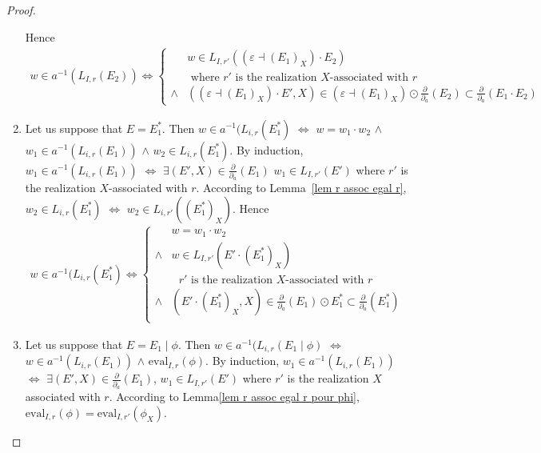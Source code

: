 \documentclass[a4paper]{llncs}
\begin{document}
\begin{proof}
\begin{enumerate}
      Hence 
        \begin{align*}
        w\in a^{-1}(L_{I,r}(E_2))
        \Leftrightarrow
        \begin{cases}
          & w\in L_{I,r'}( (\varepsilon\dashv (E_1)_X) \cdot E_2)\\
          & \text{ where $r'$ is the realization $X$-associated with $r$}\\
          \wedge & ((\varepsilon\dashv (E_1)_X) \cdot E',X) \in (\varepsilon\dashv (E_1)_X)\odot \frac{\partial}{\partial_a}(E_2) \subset \frac{\partial}{\partial_a}(E_1\cdot E_2)
        \end{cases}
        \end{align*}
\item Let us suppose that $E=E_1^*$. Then       
      $w\in a^{-1}(L_{i,r}(E_1^*)$      
      $\Leftrightarrow$ $w=w_1\cdot w_2 $ $\wedge$ $w_1\in a^{-1}(L_{i,r}(E_1))$ $\wedge$ $w_2\in L_{i,r}(E_1^*)$.      
      By induction, $w_1\in a^{-1}(L_{i,r}(E_1))$      
      $\Leftrightarrow$ $\exists (E',X)\in\frac{\partial}{\partial_a}(E_1)$ $w_1\in L_{I,r'}(E')$ where $r'$ is the realization $X$-associated with $r$.      
      According to Lemma~\ref{lem r assoc egal r}, $w_2\in L_{i,r}(E_1^*)$      
      $\Leftrightarrow$ $w_2\in L_{i,r'}((E_1^*)_X)$.      
      Hence 
        \begin{align*}
        w\in a^{-1}(L_{i,r}(E_1^*)
        \Leftrightarrow
        \begin{cases}
          & w=w_1\cdot w_2 \\
          \wedge & w\in L_{I,r'}(E'\cdot (E_1^*)_X)\\
          & \text{ $r'$ is the realization $X$-associated with $r$}\\
          \wedge & (E'\cdot (E_1^*)_X,X) \in \frac{\partial}{\partial_a}(E_1)\odot E_1^* \subset \frac{\partial}{\partial_a}(E_1^*)\\
        \end{cases}
        \end{align*}
\item Let us suppose that $E=E_1\mid \phi$. Then      
      $w\in a^{-1}(L_{i,r}(E_1\mid \phi)$      
      $\Leftrightarrow$ $w\in a^{-1}(L_{i,r}(E_1))$ $\wedge$ $\mathrm{eval}_{I,r}(\phi)$.      
      By induction, $w_1\in a^{-1}(L_{i,r}(E_1))$      
      $\Leftrightarrow$ $\exists (E',X)\in\frac{\partial}{\partial_a}(E_1)$, $w_1\in L_{I,r'}(E')$ where $r'$ is the realization $X$ associated with $r$.      
      According to Lemma\ref{lem r assoc egal r pour phi}, $\mathrm{eval}_{I,r}(\phi)=\mathrm{eval}_{I,r'}(\phi_X)$.      

\end{enumerate}
\end{proof}
\end{document}

